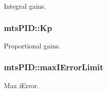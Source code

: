 Integral gains. 

\hypertarget{classmts_p_i_d_a0aa502158f417e137495a5c2ded4c5d0}{
\subsubsection[{Kp}]{ mts\-P\-I\-D\-::\-Kp\hspace{0.3cm}{\ttfamily [protected]}}}\label{classmts_p_i_d_a0aa502158f417e137495a5c2ded4c5d0}


Proportional gains. 

\hypertarget{classmts_p_i_d_a15180d5531a92d2bd2d9ced43496165e}{
\subsubsection[{max\-I\-Error\-Limit}]{ mts\-P\-I\-D\-::max\-I\-Error\-Limit\hspace{0.3cm}{\ttfamily [protected]}}}\label{classmts_p_i_d_a15180d5531a92d2bd2d9ced43496165e}


Max i\-Error. 

